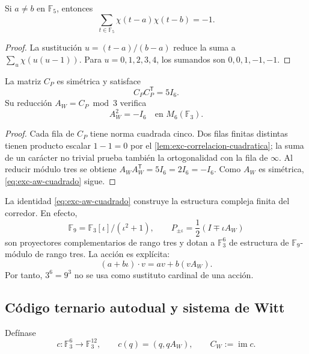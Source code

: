 \begin{lemma}
\label{lem:exc-correlacion-cuadratica}
Si \(a\ne b\) en \(\mathbb F_5\), entonces
\[
 \sum_{t\in\mathbb F_5}\chi(t-a)\chi(t-b)=-1.
\]
\end{lemma}

\begin{proof}
La sustitución \(u=(t-a)/(b-a)\) reduce la suma a
\(\sum_u\chi(u(u-1))\). Para \(u=0,1,2,3,4\), los sumandos son
\(0,0,1,-1,-1\).
\end{proof}

\begin{proposition}
\label{prop:exc-paley-witt}
La matriz \(C_P\) es simétrica y satisface
\[
 C_PC_P^{\mathsf T}=5I_6.
\]
Su reducción \(A_W=C_P\bmod3\) verifica
\begin{equation}
 \boxed{A_W^2=-I_6\quad\text{en }M_6(\mathbb F_3).}
 \label{eq:exc-aw-cuadrado}
\end{equation}
\end{proposition}

\begin{proof}
Cada fila de \(C_P\) tiene norma cuadrada cinco. Dos filas finitas
distintas tienen producto escalar \(1-1=0\) por el
\cref{lem:exc-correlacion-cuadratica}; la suma de un carácter no trivial
prueba también la ortogonalidad con la fila de \(\infty\). Al reducir módulo
tres se obtiene
\(A_WA_W^{\mathsf T}=5I_6=2I_6=-I_6\). Como \(A_W\) es simétrica,
\eqref{eq:exc-aw-cuadrado} sigue.
\end{proof}

La identidad \eqref{eq:exc-aw-cuadrado} construye la estructura compleja
finita del corredor. En efecto,
\[
 \mathbb F_9=\mathbb F_3[\iota]/(\iota^2+1),
 \qquad
 P_{\pm\iota}=\frac12(I\mp\iota A_W)
\]
son proyectores complementarios de rango tres y dotan a
\(\mathbb F_3^6\) de estructura de \(\mathbb F_9\)-módulo de rango tres.
La acción es explícita:
\begin{equation}
 (a+b\iota)\cdot v=av+b(vA_W).
 \label{eq:exc-accion-f9}
\end{equation}
Por tanto, \(3^6=9^3\) no se usa como sustituto cardinal de una acción.

\subsection{Código ternario autodual y sistema de Witt}

Defínase
\begin{equation}
 c:\mathbb F_3^6\longrightarrow\mathbb F_3^{12},
 \qquad c(q)=(q,qA_W),
 \qquad C_W:=\operatorname{im}c.
 \label{eq:exc-codigo-grafico}
\end{equation}

